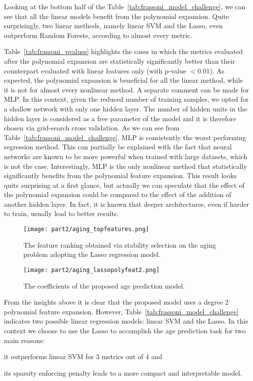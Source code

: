Looking at the bottom half of the Table~\ref{tab:frassoni_model_challenge}, we can see that all the linear models benefit from the polynomial expansion. Quite surprisingly, two linear methods, namely linear SVM and the Lasso, even outperform Random Forests, according to almost every metric.

Table~\ref{tab:frassoni_pvalues} highlights the cases in which the metrics evaluated after the polynomial expansion are statistically significantly better than their counterpart evaluated with linear features only (with p-value $< 0.01$).
As expected, the polynomial expansion is beneficial for all the linear method, while it is not for almost every nonlinear method.
A separate comment can be made for MLP. In this context, given the reduced number of training samples, we opted for a shallow network with only one hidden layer. The number of hidden units in the hidden layer is considered as a free parameter of the model and it is therefore chosen via grid-search cross validation.
As we can see from Table~\ref{tab:frassoni_model_challenge}, MLP is consistently the worst performing regression method. This can partially be explained with the fact that neural networks are known to be more powerful when trained with large datasets, which is not the case. Interestingly, MLP is the only nonlinear method that statistically significantly benefits from the polynomial feature expansion.
This result looks quite surprising at a first glance, but actually we can speculate that the effect of the polynomial expansion could be compared to the effect of the addition of another hidden layer. In fact, it is known that deeper architectures, even if harder to train, usually lead to better results.

\begin{figure}[h!]
	\centering
	\texttt{[image: part2/aging\_topfeatures.png]}
	\caption{The feature ranking obtained via stability selection on the aging problem adopting the Lasso regression model.} \label{fig:frassoni_topfeat}
\end{figure}

\begin{figure}[h!]
	\centering
	\texttt{[image: part2/aging\_lassopolyfeat2.png]}
	\caption{The coefficients of the proposed age prediction model.} \label{fig:frassoni_topmodel}
\end{figure}

From the insights above it is clear that the proposed model uses a degree $2$ polynomial feature expansion. However, Table~\ref{tab:frassoni_model_challenge} indicates two possible linear regression models: linear SVM and the Lasso. In this context we choose to use the Lasso to accomplish the age prediction task for two main reasons:
\begin{enumerate*}[label=(\roman*)]
	\item it outperforms linear SVM for $3$ metrics out of $4$ and
	\item its sparsity enforcing penalty leads to a more compact and interpretable model.
\end{enumerate*}

